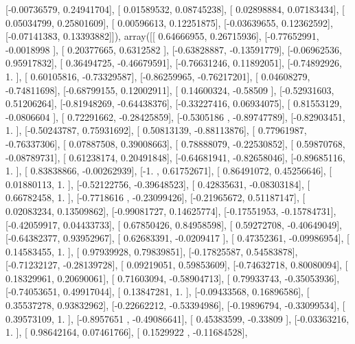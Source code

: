 \documentclass{article}
\begin{document}
       [-0.00736579,  0.24941704],
       [ 0.01589532,  0.08745238],
       [ 0.02898884,  0.07183434],
       [ 0.05034799,  0.25801609],
       [ 0.00596613,  0.12251875],
       [-0.03639655,  0.12362592],
       [-0.07141383,  0.13393882]]), array([[ 0.64666955,  0.26715936],
       [-0.77652991, -0.0018998 ],
       [ 0.20377665,  0.6312582 ],
       [-0.63828887, -0.13591779],
       [-0.06962536,  0.95917832],
       [ 0.36494725, -0.46679591],
       [-0.76631246,  0.11892051],
       [-0.74892926,  1.        ],
       [ 0.60105816, -0.73329587],
       [-0.86259965, -0.76217201],
       [ 0.04608279, -0.74811698],
       [-0.68799155,  0.12002911],
       [ 0.14600324, -0.58509   ],
       [-0.52931603,  0.51206264],
       [-0.81948269, -0.64438376],
       [-0.33227416,  0.06934075],
       [ 0.81553129, -0.0806604 ],
       [ 0.72291662, -0.28425859],
       [-0.5305186 , -0.89747789],
       [-0.82903451,  1.        ],
       [-0.50243787,  0.75931692],
       [ 0.50813139, -0.88113876],
       [ 0.77961987, -0.76337306],
       [ 0.07887508,  0.39008663],
       [ 0.78888079, -0.22530852],
       [ 0.59870768, -0.08789731],
       [ 0.61238174,  0.20491848],
       [-0.64681941, -0.82658046],
       [-0.89685116,  1.        ],
       [ 0.83838866, -0.00262939],
       [-1.        ,  0.61752671],
       [ 0.86491072,  0.45256646],
       [ 0.01880113,  1.        ],
       [-0.52122756, -0.39648523],
       [ 0.42835631, -0.08303184],
       [ 0.66782458,  1.        ],
       [-0.7718616 , -0.23099426],
       [-0.21965672,  0.51187147],
       [ 0.02083234,  0.13509862],
       [-0.99081727,  0.14625774],
       [-0.17551953, -0.15784731],
       [-0.42059917,  0.04433733],
       [ 0.67850426,  0.84958598],
       [ 0.59272708, -0.40649049],
       [-0.64382377,  0.93952967],
       [ 0.62683391, -0.0209417 ],
       [ 0.47352361, -0.09986954],
       [ 0.14583455,  1.        ],
       [ 0.97939928,  0.79839851],
       [-0.17825587,  0.54583878],
       [-0.71232127, -0.28139728],
       [ 0.09219051,  0.59853609],
       [-0.74632718,  0.80080094],
       [ 0.18329961,  0.20690061],
       [ 0.71603094, -0.58904713],
       [ 0.79933743, -0.35053936],
       [-0.74053651,  0.49917044],
       [ 0.13847281,  1.        ],
       [-0.09433568,  0.16896586],
       [ 0.35537278,  0.93832962],
       [-0.22662212, -0.53394986],
       [-0.19896794, -0.33099534],
       [ 0.39573109,  1.        ],
       [-0.8957651 , -0.49086641],
       [ 0.45383599, -0.33809   ],
       [-0.03363216,  1.        ],
       [ 0.98642164,  0.07461766],
       [ 0.1529922 , -0.11684528],
\end{document}

